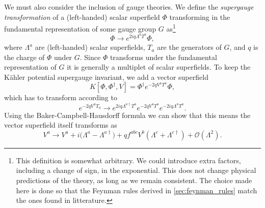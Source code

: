 We must also consider the inclusion of gauge theories.
We define the \emph{supergauge transformation} of a (left-handed) scalar superfield $\Phi$ transforming in the fundamental representation of some gauge group $G$ as\footnote{This definition is somewhat arbitrary. We could introduce extra factors, including a change of sign, in the exponential. This does not change physical predictions of the theory, as long as we remain consistent. The choice made here is done so that the Feynman rules derived in \cref{sec:feynman_rules} match the ones found in litterature.}
\begin{equation}
    \Phi \to e^{2iq\Lambda^a T^a}\Phi \label{eq:gauge_scalar},
\end{equation}
where $\Lambda^a$ are (left-handed) scalar superfields, $T_a$ are the generators of $G$, and $q$ is the charge of $\Phi$ under $G$.
Since $\Phi$ transforms under the fundamental representation of $G$ it is generally a multiplet of scalar superfields.
To keep the K\"ahler potential supergauge invariant, we add a vector superfield
\begin{equation}\label{eq:kahler}
    K[\Phi,\Phi^\dagger,V] = \Phi^\dagger e^{-2qV^aT^a} \Phi,
\end{equation}
which has to transform according to
\begin{equation}
    e^{-2qV^aT_a} \to e^{2iq\Lambda^{a\dagger} T^a} e^{-2qV^a T^a} e^{-2iq\Lambda^a T^a}.
\end{equation}
Using the Baker-Campbell-Hausdorff formula  we can show that this means the vector superfield itself transforms as
\begin{equation}
    V^a \to V^a + i\bigl(\Lambda^a - \Lambda^{a\dagger} \bigr) + qf^{abc} V^b (\Lambda^c + \Lambda^{c\dagger}) + \mathcal{O}(\Lambda^2).
    \label{eq:gauge_vector}
\end{equation}


